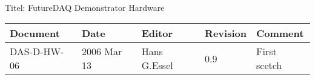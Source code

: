 \\Titel: FutureDAQ Demonstrator Hardware
\begin{table}[h]
\begin{tabular}{|p{2.8cm}|p{2.0cm}|p{3.0cm}|p{1.6cm}|p{5.0cm}|} \hline
Document   & Date        & Editor       & Revision & Comment \\
\hline DAS-D-HW-06 & 2006 Mar 13 & Hans G.Essel & 0.9      & First
scetch \\ \hline
\end{tabular}
\end{table}
